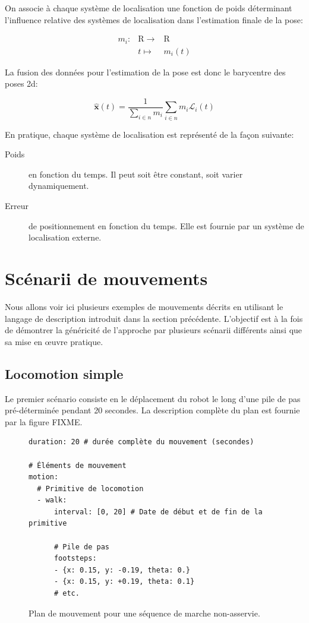 On associe à chaque système de localisation une fonction de poids
déterminant l'influence relative des systèmes de localisation dans
l'estimation finale de la pose:

\begin{equation}
  \begin{array}{ccc}
    m_i : & \mathrm{R} \rightarrow & \mathrm{R}\\
    ~ & t \mapsto & m_i(t)
  \end{array}
\end{equation}

La fusion des données pour l'estimation de la pose est donc le
barycentre des poses 2d:

\begin{equation}
  \mathbf{\hat{x}}(t) = \frac{1}{\sum_{i \in n} m_i} \sum_{i \in n} m_i \mathcal{L}_i(t)
\end{equation}

En pratique, chaque système de localisation est représenté de la façon suivante:
\begin{description}
\item[Poids] en fonction du temps. Il peut soit être constant, soit
  varier dynamiquement.
\item[Erreur] de positionnement en fonction du temps. Elle est fournie
  par un système de localisation externe.
\end{description}


\section{Scénarii de mouvements}


Nous allons voir ici plusieurs exemples de mouvements décrits en
utilisant le langage de description introduit dans la section
précédente. L'objectif est à la fois de démontrer la généricité de
l'approche par plusieurs scénarii différents ainsi que sa mise en
\oe uvre pratique.


\subsection{Locomotion simple}

Le premier scénario consiste en le déplacement du robot le long d'une
pile de pas pré-déterminée pendant 20 secondes. La description
complète du plan est fournie par la figure FIXME.

\begin{figure}
  \begin{center}
\begin{verbatim}
duration: 20 # durée complète du mouvement (secondes)

# Éléments de mouvement
motion:
  # Primitive de locomotion
  - walk:
      interval: [0, 20] # Date de début et de fin de la primitive

      # Pile de pas
      footsteps:
      - {x: 0.15, y: -0.19, theta: 0.}
      - {x: 0.15, y: +0.19, theta: 0.1}
      # etc.
\end{verbatim}
  \end{center}
  \caption{Plan de mouvement pour une séquence de marche non-asservie.}
\end{figure}

